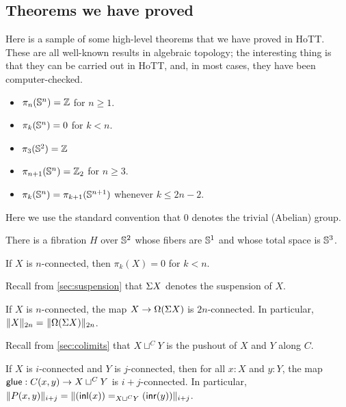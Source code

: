 \subsection{Theorems we have proved}

Here is a sample of some high-level theorems that we have proved in
HoTT.  These are all well-known results in algebraic topology; the
interesting thing is that they can be carried out in HoTT, and, in most
cases, they have been computer-checked.

\begin{thm} \mbox{}
\begin{itemize}
\item $\pi_n(\Sn ^n) = \Z$ for $n \ge 1$.
\item $\pi_k(\Sn ^n) = 0$ for $k < n$.  
\item $\pi_3(\Sn ^2) = \Z$
\item $\pi_{n+1}(\Sn ^n) = \Z_2$ for $n \ge 3$.    
\item $\pi_k(\Sn ^n) = \pi_{k+1}(\Sn ^{n+1})$ whenever $k \le 2n - 2$.  
\end{itemize}
\end{thm}

Here we use the standard convention that $0$ denotes the trivial (Abelian) group.

\begin{thm}
There is a fibration $H$ over $\Sn ^2$ whose fibers are $\Sn ^1$ and
whose total space is $\Sn ^3$.  
\end{thm}

\begin{thm}
  If $X$ is $n$-connected, then $\pi_k(X) = 0$ for $k < n$.
\end{thm}

Recall from \autoref{sec:suspension} that $\susp X$ denotes the suspension of $X$.

\begin{thm}
  If $X$ is $n$-connected, the map $X \rightarrow \Omega(\susp X)$ is $2n$-connected.
  In particular, $\id{\trunc{2n}{X}}{\trunc{2n}{\Omega(\susp X)}}$.
\end{thm}

Recall from \autoref{sec:colimits} that $X \sqcup^C Y$ is the pushout of $X$ and $Y$ along $C$.

\begin{thm}
  If $X$ is $i$-connected and $Y$ is
  $j$-connected, then for all $x:X$ and $y:Y$, the map $\glue : C(x,y)
  \rightarrow X \sqcup^C Y$ is $i+j$-connected.  In
  particular, $\trunc {i+j} {P(x,y)} = \trunc {i+j} {\id [X \sqcup^C Y]
    {(\inl(x))} {(\inr(y))}}$.
\end{thm}

